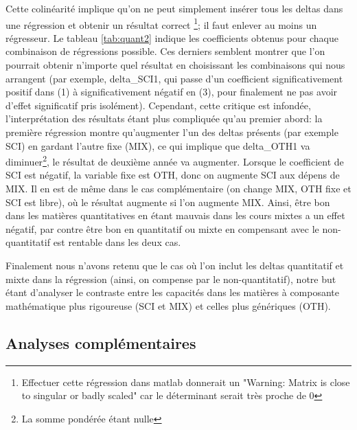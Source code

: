 Cette colinéarité implique qu'on ne peut simplement insérer tous les deltas dans une régression et obtenir un résultat correct \footnote{Effectuer cette régression dans matlab donnerait un "Warning: Matrix is close to singular or badly scaled" car le déterminant serait très proche de 0}; il faut enlever au moins un régresseur. Le tableau \ref{tab:quant2} indique les coefficients obtenus pour chaque combinaison de régressions possible. Ces derniers semblent montrer que l'on pourrait obtenir n'importe quel résultat en choisissant les combinaisons qui nous arrangent (par exemple, delta\_SCI1, qui passe d'un coefficient significativement positif dans (1) à significativement négatif en (3), pour finalement ne pas avoir d'effet significatif pris isolément). Cependant, cette critique est infondée, l'interprétation des résultats étant plus compliquée qu'au premier abord: la première régression montre qu'augmenter l'un des deltas présents (par exemple SCI) en gardant l'autre fixe (MIX), ce qui implique que delta\_OTH1 va diminuer\footnote {La somme pondérée étant nulle}, le résultat de deuxième année va augmenter. Lorsque le coefficient de SCI est négatif, la variable fixe est OTH, donc on augmente SCI aux dépens de MIX. Il en est de même dans le cas complémentaire (on change MIX, OTH fixe et SCI est libre), où le résultat augmente si l'on augmente MIX. Ainsi, être bon dans les matières quantitatives en étant mauvais dans les cours mixtes a un effet négatif, par contre être bon en quantitatif ou mixte en compensant avec le non-quantitatif est rentable dans les deux cas.

Finalement nous n'avons retenu que le cas où l'on inclut les deltas quantitatif et mixte dans la régression (ainsi, on compense par le non-quantitatif), notre but étant d'analyser le contraste entre les capacités dans les matières à composante mathématique plus rigoureuse (SCI et MIX) et celles plus génériques (OTH).


\subsection{Analyses complémentaires}



